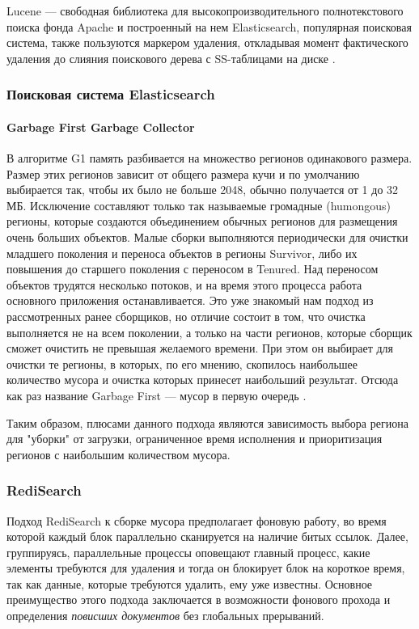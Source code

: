 Lucene\cite{Lucene:2008} — свободная библиотека для высокопроизводительного
полнотекстового поиска фонда Apache и построенный на нем Elasticsearch\cite{Elasticsearch:2020},
популярная поисковая система, также пользуются маркером удаления, откладывая
момент фактического удаления до слияния поискового дерева с SS-таблицами на
диске \cite{Elasticsearch1:2021}\cite{Elasticsearch2:2021}.

\subsubsection{Поисковая система Elasticsearch}

\paragraph{Garbage First Garbage Collector}

В алгоритме G1 память разбивается на множество регионов одинакового размера.
Размер этих регионов зависит от общего размера кучи и по умолчанию выбирается
так, чтобы их было не больше 2048, обычно получается от 1 до 32 МБ.
Исключение составляют только так называемые громадные (humongous)
регионы, которые создаются объединением обычных регионов для размещения очень
больших объектов. Малые сборки выполняются периодически для очистки младшего
поколения и переноса объектов в регионы Survivor, либо их повышения до
старшего поколения с переносом в Tenured. Над переносом объектов трудятся несколько
потоков, и на время этого процесса работа основного приложения останавливается.
Это уже знакомый нам подход из рассмотренных ранее сборщиков, но отличие состоит
в том, что очистка выполняется не на всем поколении, а только на части регионов,
которые сборщик сможет очистить не превышая желаемого времени. При этом он выбирает
для очистки те регионы, в которых, по его мнению, скопилось наибольшее количество
мусора и очистка которых принесет наибольший результат. Отсюда как раз название
Garbage First — мусор в первую очередь \cite{G1GC:2018}.

Таким образом, плюсами данного подхода являются зависимость выбора региона для "уборки" 
от загрузки, ограниченное время исполнения и приоритизация регионов с наибольшим
количеством мусора.

\subsubsection{RediSearch}

Подход RediSearch к сборке мусора\cite{RediSearch:2021} предполагает фоновую работу,
во время которой каждый блок параллельно сканируется на наличие битых ссылок. Далее,
группируясь, параллельные процессы оповещают главный процесс, какие элементы
требуются для удаления и тогда он блокирует блок на короткое время, так как данные,
которые требуются удалить, ему уже известны. Основное преимущество этого подхода
заключается в возможности фонового прохода и определения \textit{повисших документов}
без глобальных прерываний.


